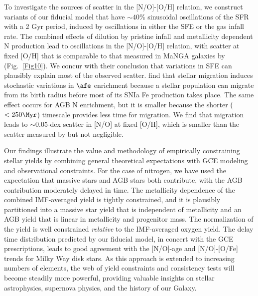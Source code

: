 To investigate the sources of scatter in the [N/O]-[O/H] relation, we construct
variants of our fiducial model that have $\sim 40\%$ sinusoidal oscillations
of the SFR with a 2 Gyr period, induced by oscillations in either the SFE
or the gas infall rate.  The combined effects of dilution by pristine infall
and metallicity dependent N production lead to oscillations in the 
[N/O]-[O/H] relation, with scatter at fixed [O/H] that is comparable to
that measured in MaNGA galaxies by \cite{Schaefer2020} (Fig.~\ref{Fig10}).
We concur with their conclusion that variations in SFE can plausibly explain
most of the observed scatter.  \cite{Johnson2021} find that stellar migration
induces stochastic variations in $\afe$ enrichment because a stellar population
can migrate from its birth radius before most of its SNIa Fe
production takes place.  The same effect occurs for AGB N enrichment, but
it is smaller because the shorter ($<250\Myr$) timescale provides less time
for migration.  We find that migration leads to $\sim 0.05$-dex scatter in
[N/O] at fixed [O/H], which is smaller than the scatter measured by
\cite{Schaefer2020} but not negligible.

Our findings illustrate the value and methodology of empirically constraining
stellar yields by combining general theoretical expectations with GCE modeling
and observational constraints.  For the case of nitrogen, we have used the
expectation that massive stars and AGB stars both contribute, with the AGB
contribution moderately delayed in time.  The metallicity dependence of the
combined IMF-averaged yield is tightly constrained, and it is plausibly 
partitioned into a massive star yield that is independent of metallicity and
an AGB yield that is linear in metallicity and progenitor mass.
The normalization of the yield is well constrained {\it relative} to the
IMF-averaged oxygen yield.  The delay time distribution predicted by our
fiducial model, in concert with the \cite{Johnson2021} GCE prescriptions,
leads to good agreement with the [N/O]-age and [N/O]-[O/Fe] trends for
Milky Way disk stars.  As this approach is extended to increasing numbers
of elements, the web of yield constraints and consistency tests will become
steadily more powerful, providing valuable insights on stellar astrophysics,
supernova physics, and the history of our Galaxy.
